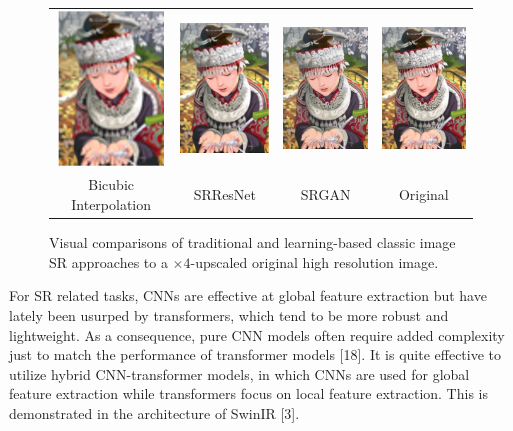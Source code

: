 \documentclass{article}
\begin{document}
\begin{figure}\label{fig:example}
    \centering
    \begin{tabular}{c c c c}
        \includegraphics[width=80pt]{bicubic.png} & \includegraphics[width=80pt]{srresnet.png} & \includegraphics[width=80pt]{srgan.png} & \includegraphics[width=80pt]{original.png} \\
        \small Bicubic Interpolation              & \small SRResNet                            & \small SRGAN                            & \small Original
    \end{tabular}
    \caption{Visual comparisons of traditional and learning-based classic image SR approaches to a $\times 4$-upscaled original high resolution image.}
\end{figure}

For SR related tasks, CNNs are effective at global feature extraction but have lately been usurped by transformers, which tend to be more robust and lightweight. As a consequence, pure CNN models often require added complexity just to match the performance of transformer models [18]. It is quite effective to utilize hybrid CNN-transformer models, in which CNNs are used for global feature extraction while transformers focus on local feature extraction. This is demonstrated in the architecture of SwinIR [3].
\end{document}
